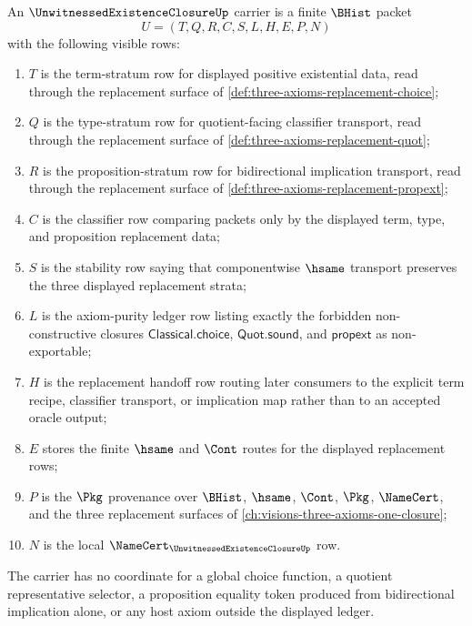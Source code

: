 \begin{definition}
\label{def:unwitnessed-existence-closure-carrier}
An $\UnwitnessedExistenceClosureUp$ carrier is a finite $\BHist$ packet
$$
U=(T,Q,R,C,S,L,H,E,P,N)
$$
with the following visible rows:
\begin{enumerate}
\item $T$ is the term-stratum row for displayed positive existential data, read through the replacement surface of \autoref{def:three-axioms-replacement-choice};
\item $Q$ is the type-stratum row for quotient-facing classifier transport, read through the replacement surface of \autoref{def:three-axioms-replacement-quot};
\item $R$ is the proposition-stratum row for bidirectional implication transport, read through the replacement surface of \autoref{def:three-axioms-replacement-propext};
\item $C$ is the classifier row comparing packets only by the displayed term, type, and proposition replacement data;
\item $S$ is the stability row saying that componentwise $\hsame$ transport preserves the three displayed replacement strata;
\item $L$ is the axiom-purity ledger row listing exactly the forbidden non-constructive closures $\mathsf{Classical.choice}$, $\mathsf{Quot.sound}$, and $\mathsf{propext}$ as non-exportable;
\item $H$ is the replacement handoff row routing later consumers to the explicit term recipe, classifier transport, or implication map rather than to an accepted oracle output;
\item $E$ stores the finite $\hsame$ and $\Cont$ routes for the displayed replacement rows;
\item $P$ is the $\Pkg$ provenance over $\BHist$, $\hsame$, $\Cont$, $\Pkg$, $\NameCert$, and the three replacement surfaces of \autoref{ch:visions-three-axioms-one-closure};
\item $N$ is the local $\NameCert_{\UnwitnessedExistenceClosureUp}$ row.
\end{enumerate}
The carrier has no coordinate for a global choice function, a quotient representative selector, a proposition equality token produced from bidirectional implication alone, or any host axiom outside the displayed ledger.
\end{definition}

